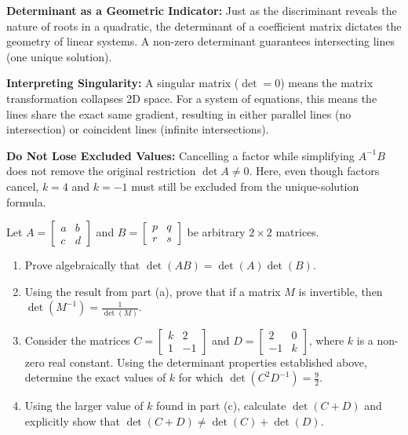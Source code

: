 \begin{takeaways}
\item \textbf{Determinant as a Geometric Indicator:} Just as the discriminant reveals the nature of roots in a quadratic, the determinant of a coefficient matrix dictates the geometry of linear systems. A non-zero determinant guarantees intersecting lines (one unique solution).
\item \textbf{Interpreting Singularity:} A singular matrix ($\det = 0$) means the matrix transformation collapses 2D space. For a system of equations, this means the lines share the exact same gradient, resulting in either parallel lines (no intersection) or coincident lines (infinite intersections).
\item \textbf{Do Not Lose Excluded Values:} Cancelling a factor while simplifying $A^{-1}B$ does not remove the original restriction $\det A\neq0$. Here, even though factors cancel, $k=4$ and $k=-1$ must still be excluded from the unique-solution formula.
\end{takeaways}


\begin{problem}
Let $A = \begin{bmatrix} a & b \\ c & d \end{bmatrix}$ and $B = \begin{bmatrix} p & q \\ r & s \end{bmatrix}$ be arbitrary $2 \times 2$ matrices.

\begin{enumerate}[label=\textbf{(\alph*)}]
    \item Prove algebraically that $\det(AB) = \det(A)\det(B)$.
    \item Using the result from part (a), prove that if a matrix $M$ is invertible, then $\det(M^{-1}) = \frac{1}{\det(M)}$.
    \item Consider the matrices $C = \begin{bmatrix} k & 2 \\ 1 & -1 \end{bmatrix}$ and $D = \begin{bmatrix} 2 & 0 \\ -1 & k \end{bmatrix}$, where $k$ is a non-zero real constant. Using the determinant properties established above, determine the exact values of $k$ for which $\det(C^2 D^{-1}) = \frac{9}{2}$.
    \item Using the larger value of $k$ found in part (c), calculate $\det(C+D)$ and explicitly show that $\det(C+D) \neq \det(C) + \det(D)$.
\end{enumerate}
\end{problem}

